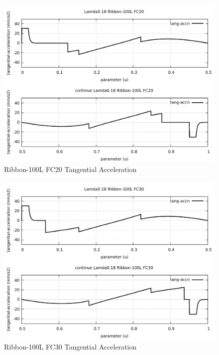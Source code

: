 \begin{figure}
	\caption     {Ribbon-100L FC20 Tangential Acceleration}
	\label{22-img-Ribbon-100L-FC20-Tangential-Acceleration.pdf}
\includegraphics[width=1.00\textwidth]{Chap4/appendix/app-Ribbon-100L/plots/22-img-Ribbon-100L-FC20-Tangential-Acceleration.pdf}
\end{figure}

\clearpage
\pagebreak

\begin{figure}
	\caption     {Ribbon-100L FC30 Tangential Acceleration}
	\label{23-img-Ribbon-100L-FC30-Tangential-Acceleration.pdf}
\includegraphics[width=1.00\textwidth]{Chap4/appendix/app-Ribbon-100L/plots/23-img-Ribbon-100L-FC30-Tangential-Acceleration.pdf}
\end{figure}


